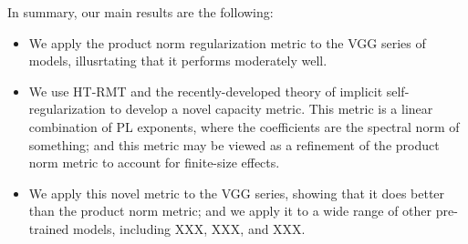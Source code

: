 In summary, our main results are the following:
\begin{itemize}
\item
We apply the product norm regularization metric to the VGG series of models, illusrtating that it performs moderately well.
\item
We use HT-RMT and the recently-developed theory of implicit self-regularization to develop a novel capacity metric.
This metric is a linear combination of PL exponents, where the coefficients are the spectral norm of something; and this metric may be viewed as a refinement of the product norm metric to account for finite-size effects.
\item
We apply this novel metric to the VGG series, showing that it does better than the product norm metric; and we apply it to a wide range of other pre-trained models, including XXX, XXX, and XXX.

\end{itemize}

